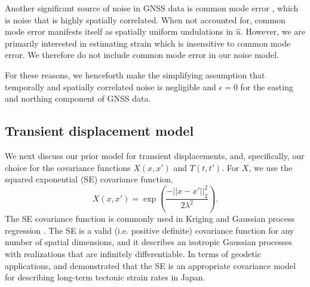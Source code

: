 \documentclass[10pt,a4paper]{article}
\begin{document}
Another significant source of noise in GNSS data is common mode error \citep[e.g.,][]{Wdowinski1997,Dong2006}, which is noise that is highly spatially correlated. When not accounted for, common mode error manifests itself as spatially uniform undulations in $\hat{u}$. However, we are primarily interested in estimating strain which is insensitive to common mode error. We therefore do not include common mode error in our noise model. 

For these reasons, we henceforth make the simplifying assumption that temporally and spatially correlated noise is negligible and $\epsilon = 0$ for the easting and northing component of GNSS data.            

\subsection{Transient displacement model}\label{sec:SignalModel}
We next discuss our prior model for transient displacements, and, specifically, our choice for the covariance functions $X(x,x')$ and $T(t,t')$. For $X$, we use the squared exponential (SE) covariance function,
\begin{equation}\label{eq:SE}
X(x,x') = \exp\left(\frac{-||x - x'||_2^2}{2 \lambda^2}\right).
\end{equation}
The SE covariance function is commonly used in Kriging \citep[e.g,][]{Cressie1992} and Gaussian process regression \citep[e.g.,][]{Rasmussen2006}.  The SE is a valid (i.e. positive definite) covariance function for any number of spatial dimensions, and it describes an isotropic Gaussian processes with realizations that are infinitely differentiable. In terms of geodetic applications, \citet{Kato1998} and \cite{El-Fiky1999} demonstrated that the SE is an appropriate covariance model for describing long-term tectonic strain rates in Japan.  
\end{document}
